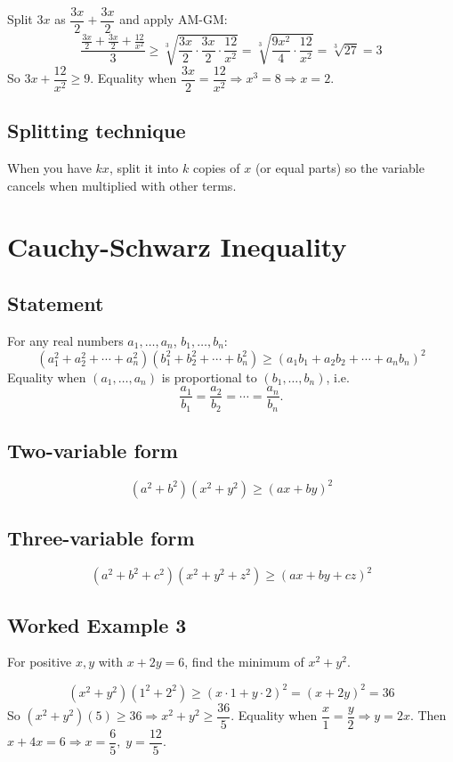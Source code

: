 \documentclass{article}
\begin{document}
Split $3x$ as $\dfrac{3x}{2} + \dfrac{3x}{2}$ and apply AM-GM:
\[
\frac{\frac{3x}{2} + \frac{3x}{2} + \frac{12}{x^2}}{3} \geq \sqrt[3]{\frac{3x}{2} \cdot \frac{3x}{2} \cdot \frac{12}{x^2}} = \sqrt[3]{\frac{9x^2}{4} \cdot \frac{12}{x^2}} = \sqrt[3]{27} = 3
\]
So $3x + \dfrac{12}{x^2} \geq 9$. Equality when $\dfrac{3x}{2} = \dfrac{12}{x^2} \Rightarrow x^3 = 8 \Rightarrow x = 2$.

\subsection{Splitting technique}
When you have $kx$, split it into $k$ copies of $x$ (or equal parts) so the variable cancels when multiplied with other terms.

\newpage

\section{Cauchy-Schwarz Inequality}

\subsection{Statement}
For any real numbers $a_1, \dots, a_n$, $b_1, \dots, b_n$:
\[
(a_1^2 + a_2^2 + \cdots + a_n^2)(b_1^2 + b_2^2 + \cdots + b_n^2) \geq (a_1 b_1 + a_2 b_2 + \cdots + a_n b_n)^2
\]
Equality when $(a_1, \dots, a_n)$ is proportional to $(b_1, \dots, b_n)$, i.e.
\[
\frac{a_1}{b_1} = \frac{a_2}{b_2} = \cdots = \frac{a_n}{b_n}.
\]

\subsection{Two-variable form}
\[
(a^2 + b^2)(x^2 + y^2) \geq (ax + by)^2
\]

\subsection{Three-variable form}
\[
(a^2 + b^2 + c^2)(x^2 + y^2 + z^2) \geq (ax + by + cz)^2
\]

\subsection{Worked Example 3}
For positive $x, y$ with $x + 2y = 6$, find the minimum of $x^2 + y^2$.

\[
(x^2 + y^2)(1^2 + 2^2) \geq (x \cdot 1 + y \cdot 2)^2 = (x + 2y)^2 = 36
\]
So $(x^2 + y^2)(5) \geq 36 \Rightarrow x^2 + y^2 \geq \dfrac{36}{5}$.
Equality when $\dfrac{x}{1} = \dfrac{y}{2} \Rightarrow y = 2x$. Then $x + 4x = 6 \Rightarrow x = \dfrac{6}{5},\; y = \dfrac{12}{5}$.
\end{document}
